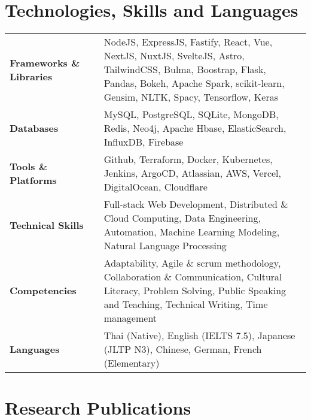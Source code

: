 \documentclass{article}
\newcommand{\hskills}[1]{
\textbf{\bfseries #1} }
\begin{document}
    \section{Technologies, Skills and Languages}
    \vspace{-0.2cm}
    \begin{tabular}{p{11em} p{1em} p{48em}}
        \hskills{Frameworks \& Libraries}&  & NodeJS, ExpressJS, Fastify, React, Vue, NextJS, NuxtJS, SvelteJS, Astro, TailwindCSS, Bulma, Boostrap, \vfill
            Flask, Pandas, Bokeh, Apache Spark, scikit-learn, Gensim, NLTK, Spacy, Tensorflow, Keras \\
        \hskills{Databases}&  & MySQL, PostgreSQL, SQLite, MongoDB, Redis, Neo4j, Apache Hbase, ElasticSearch, InfluxDB, Firebase \\
        \hskills{Tools \& Platforms}&  & Github, Terraform, Docker, Kubernetes, Jenkins, ArgoCD, Atlassian, AWS, Vercel, DigitalOcean, Cloudflare \\
        \hskills{Technical Skills}&  & Full-stack Web Development, Distributed \& Cloud Computing, Data Engineering, Automation, \vfill
            Machine Learning Modeling, Natural Language Processing \\
        \hskills{Competencies} &  & Adaptability, Agile \& scrum methodology, Collaboration \& Communication, Cultural Literacy, \vfill
            Problem Solving, Public Speaking and Teaching, Technical Writing, Time management \\
        \hskills{Languages} &  & Thai (Native), English (IELTS 7.5), Japanese (JLTP N3), Chinese, German, French (Elementary) \\
    \end{tabular}

    \vspace{-0.4cm}
    \section{Research Publications} 
    \vspace{-0.2cm}
    \renewcommand\refname{\vskip -2em}
    \nocite{*}
    \printbibliography[heading=none]
    \vspace{-0.4cm}

  
\end{document}
